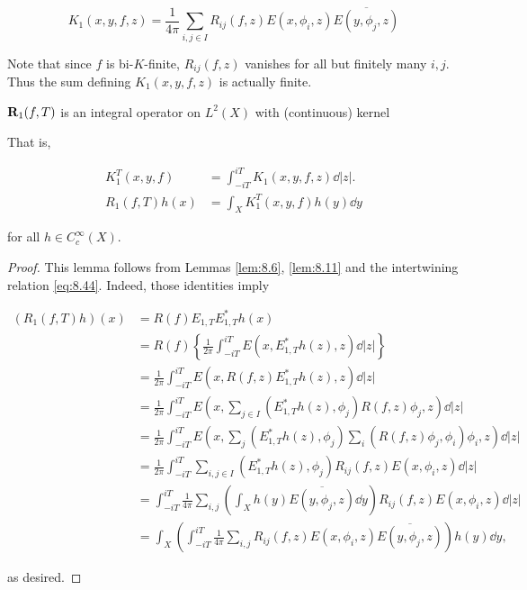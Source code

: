 \begin{equation}\label{eq:9.21}
K_1(x, y, f, z) = \frac{1}{4\pi} \sum_{i, j \in I} R_{ij}(f, z)E(x, \phi_i, z)\overline{E(y, \phi_j, z)}\tag{9.21}
\end{equation}

Note that since $f$ is bi-$K$-finite, $R_{ij}(f,z)$ vanishes for all but finitely many $i, j$. Thus the sum defining $K_1(x,y,f,z)$ is actually finite.

\begin{lemma}\label{lem:9.2}

$\mathbf{R}_1(f, T)$ is an integral operator on $L^2(X)$ with (continuous) kernel

That is,

\[
\begin{aligned}
K_1^T(x, y, f) &= \int_{-iT}^{iT} K_1(x, y, f, z)\dd|z|.\\
R_1(f, T)h(x) &= \int_X K_1^T(x, y, f)h(y)\dd y
\end{aligned}
\]

for all $h \in C_c^\infty(X)$.

\end{lemma}

\begin{proof}

This lemma follows from Lemmas \ref{lem:8.6}, \ref{lem:8.11} and the intertwining relation \eqref{eq:8.44}. Indeed, those identities imply

\[
\begin{aligned}
(R_1(f, T)h)(x) &= R(f)E_{1,T}E_{1,T}^{*}h(x)\\
&= R(f)\left\{\frac{1}{2\pi}\int_{-iT}^{iT} E(x, E_{1,T}^{*}h(z), z)\dd|z|\right\}\\
&= \frac{1}{2\pi}\int_{-iT}^{iT} E(x, R(f, z)E_{1,T}^{*}h(z), z)\dd|z|\\
&= \frac{1}{2\pi}\int_{-iT}^{iT} E\left(x, \sum_{j \in I}(E_{1,T}^{*}h(z), \phi_j)R(f, z)\phi_j, z\right)\dd|z|\\
&= \frac{1}{2\pi}\int_{-iT}^{iT} E\left(x, \sum_j (E_{1,T}^{*}h(z), \phi_j)\sum_i (R(f, z)\phi_j, \phi_i)\phi_i, z\right)\dd|z|\\
&= \frac{1}{2\pi}\int_{-iT}^{iT} \sum_{i, j \in I}(E_{1,T}^{*}h(z), \phi_j)R_{ij}(f, z)E(x, \phi_i, z)\dd|z|\\
&= \int_{-iT}^{iT} \frac{1}{4\pi}\sum_{i, j}\left(\int_X h(y)\overline{E(y, \phi_j, z)}\dd y\right)R_{ij}(f, z)E(x, \phi_i, z)\dd|z|\\
&= \int_X \left(\int_{-iT}^{iT} \frac{1}{4\pi}\sum_{i, j} R_{ij}(f, z)E(x, \phi_i, z)\overline{E(y, \phi_j, z)}\right)h(y)\dd y,
\end{aligned}
\]

as desired.

\end{proof}

